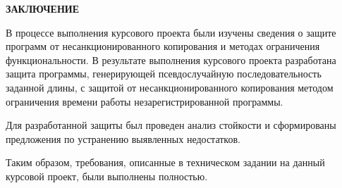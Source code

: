 \newpage
\begin{center}
  \Large{\textbf{ЗАКЛЮЧЕНИЕ}}
\end{center}

В процессе выполнения курсового проекта были изучены сведения о защите
программ от несанкционированного копирования и методах ограничения
функциональности.  В результате выполнения курсового проекта
разработана защита программы, генерирующей псевдослучайную
последовательность заданной длины, с защитой от несанкционированного
копирования методом ограничения времени работы незарегистрированной
программы.

Для разработанной защиты был проведен анализ стойкости и сформированы
предложения по устранению выявленных недостатков.

Таким образом, требования, описанные в техническом задании на данный
курсовой проект, были выполнены полностью.

\newpage
